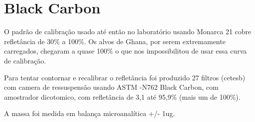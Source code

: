 \section{Black Carbon}

O padrão de calibração usado até então no laboratório usando Monarca 21 cobre refletância de 30\% a 100\%. 
Os alvos de Ghana, por serem extremamente carregados, chegaram a quase 100\% o que nos impossibilitou de usar 
essa curva de calibração.  

Para tentar contornar e recalibrar o refletância foi produzido 27 filtros (cetesb) com camera de ressuspensão
usando ASTM -N762 Black Carbon, com amostrador dicotomico, com refletância de 3,1 até 95,9\% (mais um de 100\%).

A massa foi medida em balança microanalítica +/- 1ug.








